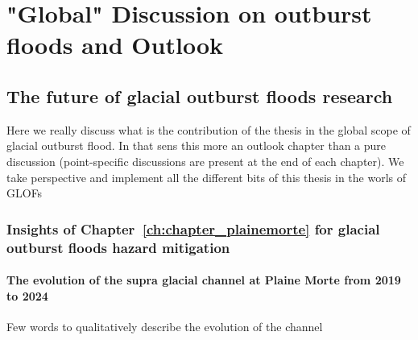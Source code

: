 \chapter{"Global" Discussion on outburst floods and Outlook}
\label{ch:discussion}

\section{The future of glacial outburst floods research}

Here we really discuss what is the contribution of the thesis in the global scope of glacial outburst flood. In that sens this more an outlook chapter than a pure discussion (point-specific discussions are present at the end of each chapter). We take perspective and implement all the different bits of this thesis in the worls of GLOFs






\subsection{Insights of Chapter~\ref{ch:chapter_plainemorte} for glacial outburst floods hazard mitigation}

\subsubsection{The evolution of the supra glacial channel at Plaine Morte from 2019 to 2024}

Few words to qualitatively describe the evolution of the channel

